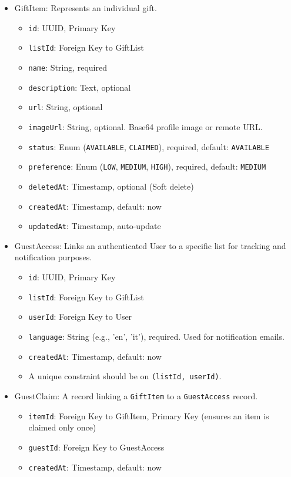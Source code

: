 \begin{itemize}
\begin{itemize}
        \end{itemize}
    \item GiftItem: Represents an individual gift.
        \begin{itemize}
            \item \texttt{id}: UUID, Primary Key
            \item \texttt{listId}: Foreign Key to GiftList
            \item \texttt{name}: String, required
            \item \texttt{description}: Text, optional
            \item \texttt{url}: String, optional
            \item \texttt{imageUrl}: String, optional. Base64 profile image or remote URL.
            \item \texttt{status}: Enum (\texttt{AVAILABLE}, \texttt{CLAIMED}), required, default: \texttt{AVAILABLE}
            \item \texttt{preference}: Enum (\texttt{LOW}, \texttt{MEDIUM}, \texttt{HIGH}), required, default: \texttt{MEDIUM}
            \item \texttt{deletedAt}: Timestamp, optional (Soft delete)
            \item \texttt{createdAt}: Timestamp, default: now
            \item \texttt{updatedAt}: Timestamp, auto-update
        \end{itemize}
    \item GuestAccess: Links an authenticated User to a specific list for tracking and notification purposes.
        \begin{itemize}
            \item \texttt{id}: UUID, Primary Key
            \item \texttt{listId}: Foreign Key to GiftList
            \item \texttt{userId}: Foreign Key to User
            \item \texttt{language}: String (e.g., 'en', 'it'), required. Used for notification emails.
            \item \texttt{createdAt}: Timestamp, default: now
            \item A unique constraint should be on \texttt{(listId, userId)}.
        \end{itemize}
    \item GuestClaim: A record linking a \texttt{GiftItem} to a \texttt{GuestAccess} record.
        \begin{itemize}
            \item \texttt{itemId}: Foreign Key to GiftItem, Primary Key (ensures an item is claimed only once)
            \item \texttt{guestId}: Foreign Key to GuestAccess
            \item \texttt{createdAt}: Timestamp, default: now
        \end{itemize}
\end{itemize}


